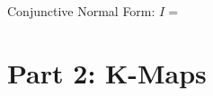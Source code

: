 \documentclass[11pt]{article}
\begin{document}
Conjunctive Normal Form: $I = $

\section{Part 2: K-Maps}






\end{document}
